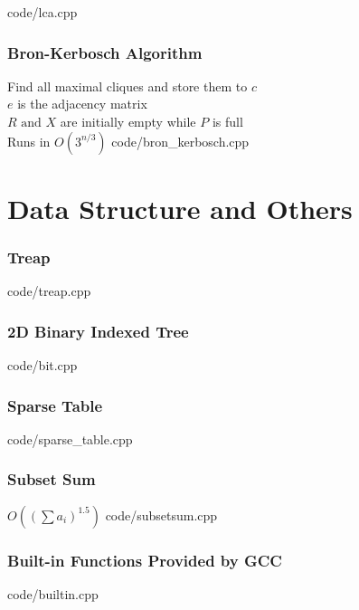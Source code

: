 \documentclass [landscape,8pt,a4paper,twocolumn]{article}
\begin{document}
 {code/lca.cpp}

\vfill\null

\section{Bron-Kerbosch Algorithm}
Find all maximal cliques and store them to $ c $ \\
$ e $ is the adjacency matrix \\
$ R \text{ and } X $ are initially empty while $ P $ is full \\
Runs in $ O(3^{n/3}) $
 {code/bron_kerbosch.cpp}

\newpage
\part{Data Structure and Others}

\section{Treap}
 {code/treap.cpp}

\section{2D Binary Indexed Tree}
 {code/bit.cpp}

\section{Sparse Table}
 {code/sparse_table.cpp}

\section{Subset Sum}
$ O((\sum a_i)^{1.5}) $
 {code/subsetsum.cpp}

\section{Built-in Functions Provided by GCC}
 {code/builtin.cpp}
\end{document}
